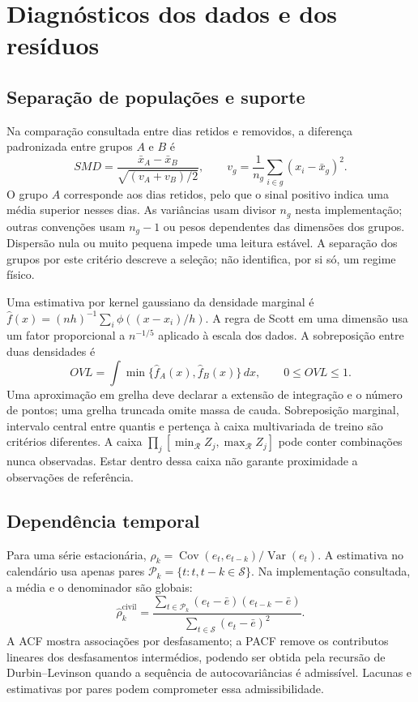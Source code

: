 \section{Diagnósticos dos dados e dos resíduos}
\label{sec:mat-diagnosticos}

\subsection{Separação de populações e suporte}
\label{sec:mat-suporte}
Na comparação consultada entre dias retidos e removidos, a diferença padronizada entre grupos $A$ e $B$ é
\begin{equation}
SMD=\frac{\bar x_A-\bar x_B}{\sqrt{(v_A+v_B)/2}},
\qquad v_g=\frac1{n_g}\sum_{i\in g}(x_i-\bar x_g)^2.
\label{eq:mat-smd}
\end{equation}
O grupo $A$ corresponde aos dias retidos, pelo que o sinal positivo indica uma média superior nesses dias. As variâncias usam divisor $n_g$ nesta implementação; outras convenções usam $n_g-1$ ou pesos dependentes das dimensões dos grupos. Dispersão nula ou muito pequena impede uma leitura estável. A separação dos grupos por este critério descreve a seleção; não identifica, por si só, um regime físico.

Uma estimativa por kernel gaussiano da densidade marginal é $\widehat f(x)=(nh)^{-1}\sum_i\phi((x-x_i)/h)$. A regra de Scott em uma dimensão usa um fator proporcional a $n^{-1/5}$ aplicado à escala dos dados. A sobreposição entre duas densidades é
\begin{equation}
OVL=\int\min\{\widehat f_A(x),\widehat f_B(x)\}\,dx,
\qquad 0\leq OVL\leq1.
\label{eq:mat-overlap}
\end{equation}
Uma aproximação em grelha deve declarar a extensão de integração e o número de pontos; uma grelha truncada omite massa de cauda. Sobreposição marginal, intervalo central entre quantis e pertença à caixa multivariada de treino são critérios diferentes. A caixa $\prod_j[\min_{\mathcal R}Z_j,\max_{\mathcal R}Z_j]$ pode conter combinações nunca observadas. Estar dentro dessa caixa não garante proximidade a observações de referência.

\subsection{Dependência temporal}
\label{sec:mat-acf}
Para uma série estacionária, $\rho_k=\operatorname{Cov}(e_t,e_{t-k})/\operatorname{Var}(e_t)$. A estimativa no calendário usa apenas pares $\mathcal P_k=\{t:t,t-k\in\mathcal S\}$. Na implementação consultada, a média e o denominador são globais:
\begin{equation}
\widehat\rho_k^{\mathrm{civil}}=
\frac{\sum_{t\in\mathcal P_k}(e_t-\bar e)(e_{t-k}-\bar e)}
{\sum_{t\in\mathcal S}(e_t-\bar e)^2}.
\label{eq:mat-acf-civil}
\end{equation}
A ACF mostra associações por desfasamento; a PACF remove os contributos lineares dos desfasamentos intermédios, podendo ser obtida pela recursão de Durbin--Levinson quando a sequência de autocovariâncias é admissível. Lacunas e estimativas por pares podem comprometer essa admissibilidade.

